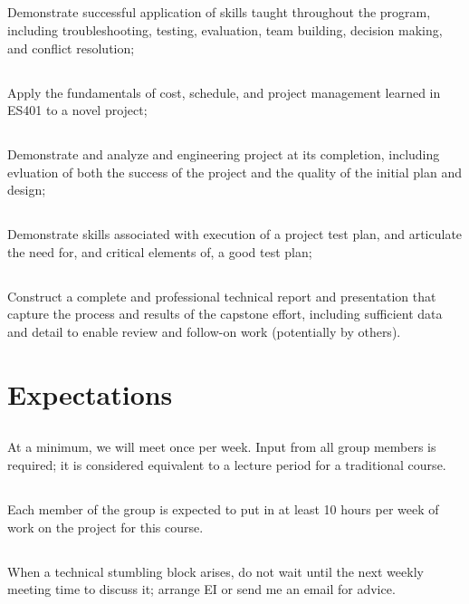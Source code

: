 \documentclass[10pt,courier]{navymemo}
\begin{document}
\subsection{} Demonstrate successful application of skills taught throughout the program, including troubleshooting, testing, evaluation, team building, decision making, and conflict resolution;
\subsection{} Apply the fundamentals of cost, schedule, and project management learned in ES401 to a novel project;
\subsection{} Demonstrate and analyze and engineering project at its completion, including evluation of both the success of the project and the quality of the initial plan and design;
\subsection{} Demonstrate skills associated with execution of a project test plan, and articulate the need for, and critical elements of, a good test plan;
\subsection{} Construct a complete and professional technical report and presentation that capture the process and results of the capstone effort, including sufficient data and detail to enable review and follow-on work (potentially by others).

\newpage
\section{Expectations}
\subsection{} At a minimum, we will meet once per week. Input from all group members is required; it is considered equivalent to a lecture period for a traditional course. 
\subsection{} Each member of the group is expected to put in at least 10 hours per week of work on the project for this course.
\subsection{} When a technical stumbling block arises, do not wait until the next weekly meeting time to discuss it; arrange EI or send me an email for advice.
\end{document}
